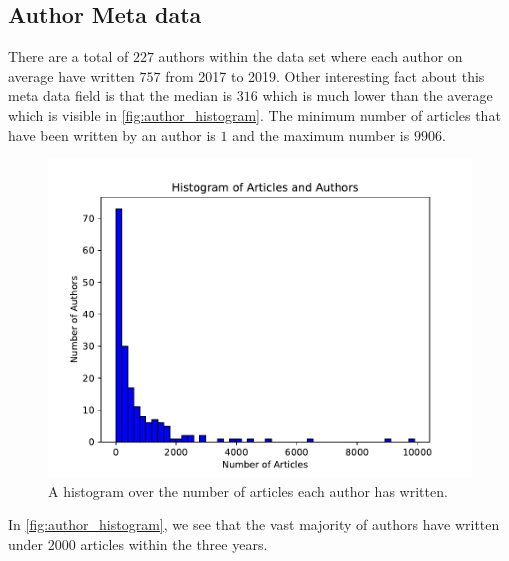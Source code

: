 \subsection{Author Meta data}
There are a total of $227$ authors within the data set where each author on average have written $757$ from 2017 to 2019.
Other interesting fact about this meta data field is that the median is $316$ which is much lower than the average which is visible in \autoref{fig:author_histogram}.
The minimum number of articles that have been written by an author is $1$ and the maximum number is $9906$.
 
\begin{figure}
	\centering
	\includegraphics[width=\linewidth]{figures/author_hist_plot.pdf}
	\caption{A histogram over the number of articles each author has written.}
	\label{fig:author_histogram}
\end{figure}
In \autoref{fig:author_histogram}, we see that the vast majority of authors have written under $2000$ articles within the three years. 
